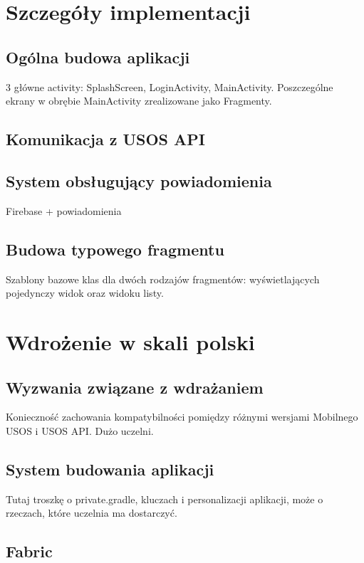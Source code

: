 \documentclass{pracamgr}
\begin{document}
\chapter{Szczegóły implementacji}

\section{Ogólna budowa aplikacji}

3 główne activity: SplashScreen, LoginActivity, MainActivity.
Poszczególne ekrany w obrębie MainActivity zrealizowane jako
Fragmenty.

\section{Komunikacja z USOS API}

\section{System obsługujący powiadomienia}

Firebase + powiadomienia

\section{Budowa typowego fragmentu}

Szablony bazowe klas dla dwóch rodzajów fragmentów:
wyświetlających pojedynczy widok oraz widoku listy.

\chapter{Wdrożenie w skali polski}

\section{Wyzwania związane z wdrażaniem}

Konieczność zachowania kompatybilności pomiędzy różnymi
wersjami Mobilnego USOS i USOS API. Dużo uczelni.

\section{System budowania aplikacji}

Tutaj troszkę o private.gradle, kluczach i personalizacji aplikacji,
może o rzeczach, które uczelnia ma dostarczyć.

\section{Fabric}
\end{document}
